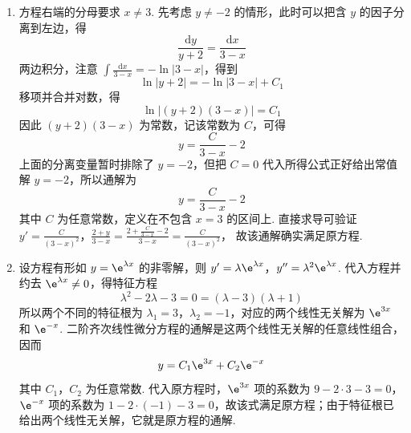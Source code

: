 \begin{solution}
\begin{enumerate}
\item 方程右端的分母要求 \(x\ne3\). 先考虑 \(y\ne-2\) 的情形，此时可以把含 \(y\) 的因子分离到左边，得
\[
\frac{\mathrm{d}y}{y+2}=\frac{\mathrm{d}x}{3-x}
\]
两边积分，注意 \(\int\frac{\mathrm{d}x}{3-x}=-\ln\left|3-x\right|\)，得到
\[
\ln\left|y+2\right|=-\ln\left|3-x\right|+C_1
\]
移项并合并对数，得
\[
\ln\left|\left(y+2\right)\left(3-x\right)\right|=C_1
\]
因此 \(\left(y+2\right)\left(3-x\right)\) 为常数，记该常数为 \(C\)，可得
\[
y=\frac{C}{3-x}-2
\]
上面的分离变量暂时排除了 \(y=-2\)，但把 \(C=0\) 代入所得公式正好给出常值解 \(y=-2\)，所以通解为
\[
y=\frac{C}{3-x}-2
\]
其中 \(C\) 为任意常数，定义在不包含 \(x=3\) 的区间上. 直接求导可验证
\(y'=\frac{C}{(3-x)^2}\)，\(\frac{2+y}{3-x}=\frac{2+\frac{C}{3-x}-2}{3-x}=\frac{C}{(3-x)^2}\)，
故该通解确实满足原方程.

\item 设方程有形如 \(y=\e^{\lambda x}\) 的非零解，则
\(y'=\lambda\e^{\lambda x}\)，\(y''=\lambda^2\e^{\lambda x}\).
代入方程并约去 \(\e^{\lambda x}\ne0\)，得特征方程
\[
\lambda^2-2\lambda-3=0=\left(\lambda-3\right)\left(\lambda+1\right)
\]
所以两个不同的特征根为 \(\lambda_1=3\)，\(\lambda_2=-1\)，对应的两个线性无关解为 \(\e^{3x}\) 和 \(\e^{-x}\). 二阶齐次线性微分方程的通解是这两个线性无关解的任意线性组合，因而
\[
y=C_1\e^{3x}+C_2\e^{-x}
\]
其中 \(C_1\)，\(C_2\) 为任意常数. 代入原方程时，\(\e^{3x}\) 项的系数为 \(9-2\cdot3-3=0\)，\(\e^{-x}\) 项的系数为 \(1-2\cdot(-1)-3=0\)，故该式满足原方程；由于特征根已给出两个线性无关解，它就是原方程的通解.
\end{enumerate}
\end{solution}
